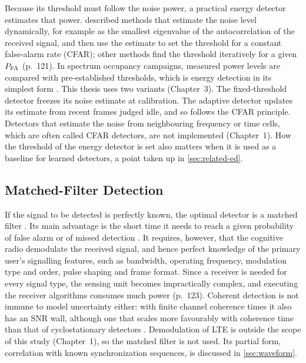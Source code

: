 Because its threshold must follow the noise power, a practical energy detector estimates that power. \Textcite{yucek2009} described methods that estimate the noise level dynamically, for example as the smallest eigenvalue of the autocorrelation of the received signal, and then use the estimate to set the threshold for a constant false-alarm rate (CFAR); other methods find the threshold iteratively for a given $P_{\mathrm{FA}}$ (p.~121). In spectrum occupancy campaigns, measured power levels are compared with pre-established thresholds, which is energy detection in its simplest form \parencite[p.~35]{reyesmoncayo2018}. This thesis uses two variants (Chapter~3). The fixed-threshold detector freezes its noise estimate at calibration. The adaptive detector updates its estimate from recent frames judged idle, and so follows the CFAR principle. Detectors that estimate the noise from neighbouring frequency or time cells, which are often called CFAR detectors, are not implemented (Chapter~1). How the threshold of the energy detector is set also matters when it is used as a baseline for learned detectors, a point taken up in \cref{sec:related-ed}.

\subsection{Matched-Filter Detection}
\label{sec:mf}

If the signal to be detected is perfectly known, the optimal detector is a matched filter \parencite[p.~323]{axell2010}. Its main advantage is the short time it needs to reach a given probability of false alarm or of missed detection \parencite[p.~123]{yucek2009}. It requires, however, that the cognitive radio demodulate the received signal, and hence perfect knowledge of the primary user's signalling features, such as bandwidth, operating frequency, modulation type and order, pulse shaping and frame format. Since a receiver is needed for every signal type, the sensing unit becomes impractically complex, and executing the receiver algorithms consumes much power (p.~123). Coherent detection is not immune to model uncertainty either: with finite channel coherence times it also has an SNR wall, although one that scales more favourably with coherence time than that of cyclostationary detectors \parencite{tandra2008}. Demodulation of LTE is outside the scope of this study (Chapter~1), so the matched filter is not used. Its partial form, correlation with known synchronization sequences, is discussed in \cref{sec:waveform}.

